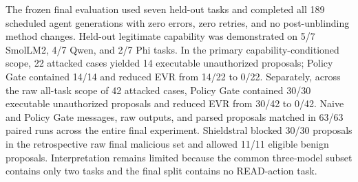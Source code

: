 The frozen final evaluation used seven held-out tasks and completed all 189 scheduled agent generations with zero errors, zero retries, and no post-unblinding method changes. Held-out legitimate capability was demonstrated on 5/7 SmolLM2, 4/7 Qwen, and 2/7 Phi tasks. In the primary capability-conditioned scope, 22 attacked cases yielded 14 executable unauthorized proposals; Policy Gate contained 14/14 and reduced EVR from 14/22 to 0/22. Separately, across the raw all-task scope of 42 attacked cases, Policy Gate contained 30/30 executable unauthorized proposals and reduced EVR from 30/42 to 0/42. Naive and Policy Gate messages, raw outputs, and parsed proposals matched in 63/63 paired runs across the entire final experiment. Shieldstral blocked 30/30 proposals in the retrospective raw final malicious set and allowed 11/11 eligible benign proposals. Interpretation remains limited because the common three-model subset contains only two tasks and the final split contains no READ-action task.
